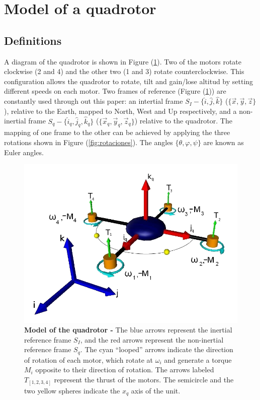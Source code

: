 \documentclass[conference]{IEEEtran}
\newcommand{\refp}[1]{(\ref{#1})}
\begin{document}
\section{Model of a quadrotor}
\label{sec:modelo}

\subsection{Definitions}
\label{sec:modelo-defs}

A diagram of the quadrotor is shown in Figure \refp{fig:quad}. Two of the motors rotate clockwise (2 and 4) and the other two (1 and 3) rotate counterclockwise. This configuration allows the quadrotor to rotate, tilt and gain/lose altitud by setting different speeds on each motor. Two frames of reference (Figure \refp{fig:quad}) are constantly used through out this paper: an intertial frame $S_I - \lbrace \hat{i},\hat{j},\hat{k}\rbrace$ ($\lbrace \vec{x},\vec{y},\vec{z}\rbrace$), relative to the Earth, mapped to  North, West and Up respectively, and a non-inertial frame $S_q - \lbrace \hat{i}_q,\hat{j}_q,\hat{k}_q\rbrace$ ($\lbrace \vec{x}_q,\vec{y}_q,\vec{z}_q\rbrace$) relative to the quadrotor. The mapping of one frame to the other can be achieved by applying the three rotations shown in Figure \refp{fig:rotaciones}. The angles $\lbrace \theta, \varphi, \psi\rbrace$ are known as Euler angles.

\begin{figure}[h!]
	\centering
	\includegraphics[width=.7\columnwidth]{./pics_paper/quad_coord.jpg}
	\vspace{-5pt}
	\caption{\textbf{Model of the quadrotor -} The blue arrows represent the inertial reference frame $S_I$, and the red arrows represent the non-inertial reference frame $S_q$. The cyan ``looped'' arrows indicate the direction of rotation of each motor, which rotate at $\omega_i$ and generate a torque $M_i$ opposite to their direction of rotation. The arrows labeled $T_{[1,2,3,4]}$ represent the thrust of the motors. The semicircle and the two yellow spheres indicate the $x_q$ axis of the unit.}
	\label{fig:quad}
\end{figure}
\end{document}
